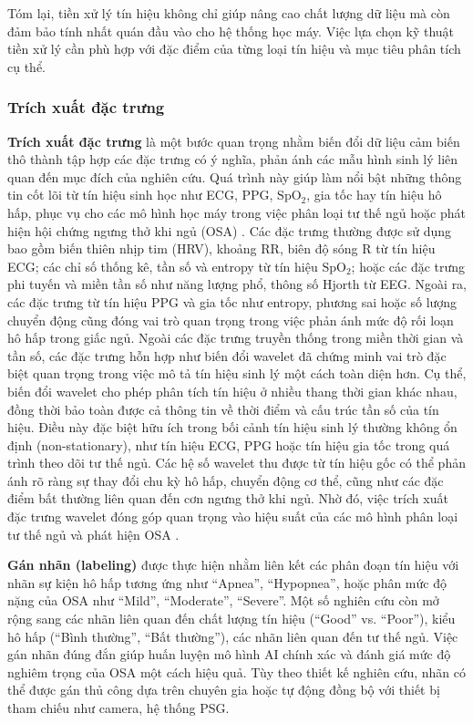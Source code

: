 Tóm lại, tiền xử lý tín hiệu không chỉ giúp nâng cao chất lượng dữ liệu mà còn đảm bảo tính nhất quán đầu vào cho hệ thống học máy. Việc lựa chọn kỹ thuật tiền xử lý cần phù hợp với đặc điểm của từng loại tín hiệu và mục tiêu phân tích cụ thể.

\subsubsection{Trích xuất đặc trưng}
\textbf{Trích xuất đặc trưng} là một bước quan trọng nhằm biến đổi dữ liệu cảm biến
thô thành tập hợp các đặc trưng có ý nghĩa, phản ánh các mẫu hình sinh lý 
liên quan đến mục đích của nghiên cứu. Quá trình này giúp làm nổi bật 
những thông tin cốt lõi từ tín hiệu sinh học như ECG, PPG, 
$\mathrm{SpO_2}$, gia tốc hay tín hiệu hô hấp, phục vụ cho các mô hình 
học máy trong việc phân loại tư thế ngủ hoặc phát hiện hội chứng ngưng 
thở khi ngủ (OSA) \cite{hstSurvey, HOANG2025116309, Channa_osa, Uday, Sang}. 
Các đặc trưng thường được sử dụng bao gồm biến thiên 
nhịp tim (HRV), khoảng RR, biên độ sóng R từ tín hiệu ECG; các chỉ số 
thống kê, tần số và entropy từ tín hiệu $\mathrm{SpO_2}$; hoặc các đặc 
trưng phi tuyến và miền tần số như năng lượng phổ, thông số Hjorth từ EEG. 
Ngoài ra, các đặc trưng từ tín hiệu PPG và gia tốc như entropy, phương sai 
hoặc số lượng chuyển động cũng đóng vai trò quan trọng trong việc phản ánh 
mức độ rối loạn hô hấp trong giấc ngủ. Ngoài các đặc trưng truyền thống 
trong miền thời gian và tần số, các đặc trưng hỗn hợp như biến đổi 
wavelet đã chứng minh vai trò đặc biệt quan trọng trong việc mô tả 
tín hiệu sinh lý một cách toàn diện hơn. Cụ thể, biến đổi wavelet 
cho phép phân tích tín hiệu ở nhiều thang thời gian khác nhau, đồng thời 
bảo toàn được cả thông tin về thời điểm và cấu trúc tần số của tín hiệu. 
Điều này đặc biệt hữu ích trong bối cảnh tín hiệu sinh lý thường không 
ổn định (non-stationary), như tín hiệu ECG, PPG hoặc tín hiệu gia tốc 
trong quá trình theo dõi tư thế ngủ. Các hệ số wavelet thu được từ tín 
hiệu gốc có thể phản ánh rõ ràng sự thay đổi chu kỳ hô hấp, chuyển động 
cơ thể, cũng như các đặc điểm bất thường liên quan đến cơn ngưng thở khi 
ngủ. Nhờ đó, việc trích xuất đặc trưng wavelet đóng góp quan trọng vào 
hiệu suất của các mô hình phân loại tư thế ngủ và phát hiện OSA \cite{Sleep_Posture_Detection}.

\textbf{Gán nhãn (labeling)}
được thực hiện nhằm liên kết các phân đoạn tín hiệu với nhãn sự kiện 
hô hấp tương ứng như “Apnea”, “Hypopnea”, hoặc phân mức độ nặng của OSA 
như “Mild”, “Moderate”, “Severe”. Một số nghiên cứu còn mở rộng sang 
các nhãn liên quan đến chất lượng tín hiệu (“Good” vs. “Poor”), 
kiểu hô hấp (“Bình thường”, “Bất thường”), các nhãn liên quan đến tư thế ngủ.
 Việc gán nhãn đúng đắn giúp huấn luyện mô hình 
AI chính xác và đánh giá mức độ nghiêm trọng của OSA một cách hiệu quả. 
Tùy theo thiết kế nghiên cứu, nhãn có thể được gán thủ công dựa trên 
chuyên gia hoặc tự động đồng bộ với thiết bị tham chiếu như
camera, hệ thống PSG.

